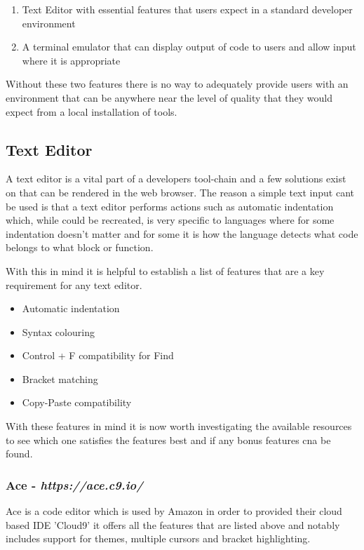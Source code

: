 \begin{enumerate}
  \item Text Editor with essential features that users expect in a standard developer environment
  \item A terminal emulator that can display output of code to users and allow input where it is appropriate
\end{enumerate}

Without these two features there is no way to adequately provide users with an environment that can be anywhere near the level of quality that they would expect from a local installation of tools.

\subsection{Text Editor}

A text editor is a vital part of a developers tool-chain and a few solutions exist on that can be rendered in the web browser. The reason a simple text input cant be used is that a text editor performs actions such as automatic indentation which, while could be recreated, is very specific to languages where for some indentation doesn't matter and for some it is how the language detects what code belongs to what block or function.

With this in mind it is helpful to establish a list of features that are a key requirement for any text editor.

\begin{itemize}
  \item Automatic indentation
  \item Syntax colouring
  \item Control + F compatibility for Find
  \item Bracket matching
  \item Copy-Paste compatibility
\end{itemize}

With these features in mind it is now worth investigating the available resources to see which one satisfies the features best and if any bonus features cna be found.

\subsubsection{Ace - \textit{https://ace.c9.io/}}

Ace is a code editor which is used by Amazon in order to provided their cloud based IDE 'Cloud9' it offers all the features that are listed above and notably includes support for themes, multiple cursors and bracket highlighting.

